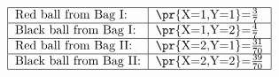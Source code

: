 \begin{align}
    \begin{tabular}{|l|l|}\hline
        Red ball from Bag I:	    &\pr{X=1,Y=1}=$\frac{3}{7}$\\\hline
        Black ball from Bag I:	&\pr{X=1,Y=2}=$\frac{4}{7}$\\\hline
        Red ball from Bag II:	&\pr{X=2,Y=1}=$\frac{31}{70}$\\\hline
        Black ball from Bag II: &\pr{X=2,Y=2}=$\frac{39}{70}$\\\hline
        \end{tabular}
    \end{align}
